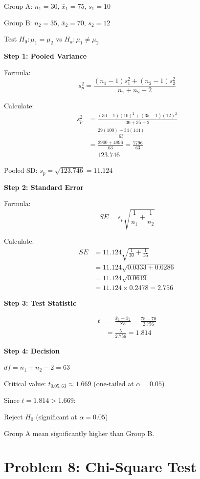 \documentclass[10pt,twocolumn]{article}
\begin{document}
Group A: $n_1 = 30$, $\bar{x}_1 = 75$, $s_1 = 10$

Group B: $n_2 = 35$, $\bar{x}_2 = 70$, $s_2 = 12$

Test $H_0: \mu_1 = \mu_2$ vs $H_a: \mu_1 \neq \mu_2$

\textbf{Step 1: Pooled Variance}

Formula:
$$s_p^2 = \frac{(n_1-1)s_1^2 + (n_2-1)s_2^2}{n_1+n_2-2}$$

Calculate:
\begin{align*}
s_p^2 &= \frac{(30-1)(10)^2 + (35-1)(12)^2}{30+35-2} \\
&= \frac{29(100) + 34(144)}{63} \\
&= \frac{2900 + 4896}{63} = \frac{7796}{63} \\
&= 123.746
\end{align*}

Pooled SD: $s_p = \sqrt{123.746} = 11.124$

\textbf{Step 2: Standard Error}

Formula:
$$SE = s_p\sqrt{\frac{1}{n_1} + \frac{1}{n_2}}$$

Calculate:
\begin{align*}
SE &= 11.124\sqrt{\frac{1}{30} + \frac{1}{35}} \\
&= 11.124\sqrt{0.0333 + 0.0286} \\
&= 11.124\sqrt{0.0619} \\
&= 11.124 \times 0.2478 = 2.756
\end{align*}

\textbf{Step 3: Test Statistic}

\begin{align*}
t &= \frac{\bar{x}_1 - \bar{x}_2}{SE} = \frac{75 - 70}{2.756} \\
&= \frac{5}{2.756} = \boxed{1.814}
\end{align*}

\textbf{Step 4: Decision}

$df = n_1 + n_2 - 2 = 63$

Critical value: $t_{0.05,63} \approx 1.669$ (one-tailed at $\alpha=0.05$)

Since $t = 1.814 > 1.669$:

$\boxed{\text{Reject } H_0}$ (significant at $\alpha=0.05$)

Group A mean significantly higher than Group B.

\section*{Problem 8: Chi-Square Test}
\end{document}
